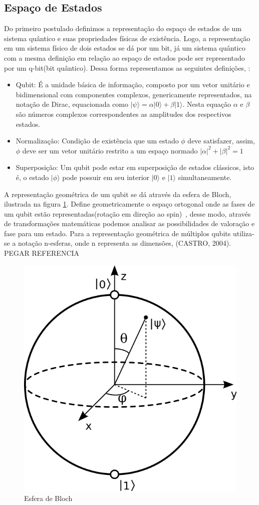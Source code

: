 \documentclass[tcc,capa]{texufpel}
\begin{document}
\subsection{Espaço de Estados}
Do primeiro postulado definimos a representação do espaço de estados de um sistema quântico e suas propriedades físicas de existência. Logo, a representação em um sistema físico de dois estados se dá por um bit, já um sistema quântico com a mesma definição em relação ao espaço de estados pode ser representado por um q-bit(bit quântico).  Dessa forma representamos as seguintes definições\cite{maron:2013:ccgrid}, \cite{Schmalfuss14}:
\begin{itemize}
    \item Qubit: É a unidade básica de informação, composto por um vetor unitário e bidimensional com componentes complexos, genericamente representados, na notação de Dirac, equacionada como $|\psi\rangle= \alpha|0\rangle + \beta|1\rangle$. Nesta equação $\alpha$ e $\beta$ são números complexos correspondentes as amplitudes dos respectivos estados.
    \item Normalização: Condição de existência que um estado $\phi$ deve satisfazer, assim, $\phi$ deve ser um vetor unitário restrito a um espaço normado $|\alpha|^2 + |\beta|^2=1$ 
    \item Superposição: Um qubit pode estar em superposição de estados clássicos, isto é, o estado $|\phi\rangle$ pode possuir em seu interior $|0\rangle$ e $|1\rangle$ simultaneamente. 
\end{itemize}

A representação geométrica de um qubit se dá através da esfera de Bloch, ilustrada na figura \ref{fig:Bloch}. Define geometricamente o espaço ortogonal onde as fases de um qubit estão representadas(rotação em direção ao spin)~\cite{chuang00a}, desse modo, através de transformações matemáticas podemos analisar as possibilidades de valoração e fase para um estado. Para a representação geométrica de múltiplos qubits utiliza-se a notação n-esferas, onde n representa as dimensões, (CASTRO, 2004). PEGAR REFERENCIA


\begin{figure}[ht]
    \centering
    \includegraphics[width=.2\textwidth]{imagens/blochSphere.png}
    \caption{Esfera de Bloch}
    \label{fig:Bloch}
\end{figure}
\end{document}
